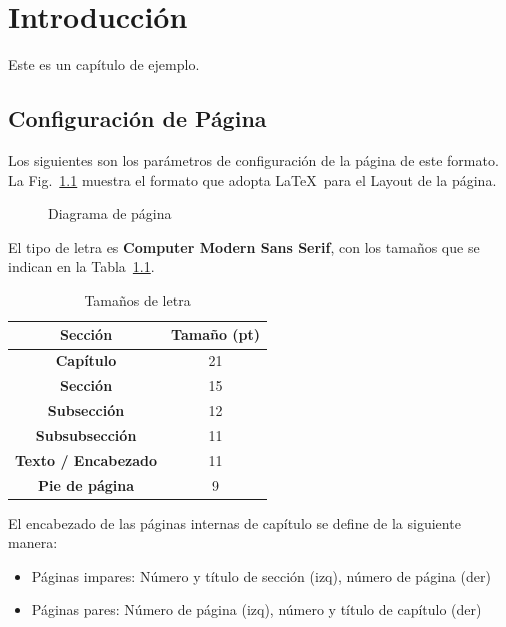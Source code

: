 \chapter{Introducción} \label{intro}
Este es un capítulo de ejemplo.

\section{Configuración de Página}

Los siguientes son los parámetros de configuración de la página de este formato. La Fig.~\ref{fig1_intro} muestra el formato que adopta \LaTeX\ para el Layout de la página. 

\pagevalues

\begin{figure}[ht]
	\pagediagram
	\caption{Diagrama de página}
	\label{fig1_intro}
\end{figure}

El tipo de letra es \textbf{Computer Modern Sans Serif}, con los tamaños que se indican en la Tabla~\ref{table2_intro}.

\begin{table}[htb]
\renewcommand{\arraystretch}{1.3}
	\caption{Tamaños de letra} 
	\label{table2_intro}
	\centering
	\setlength\tabcolsep{2pt}
	\begin{tabular}{c c}
		\hline
		\bfseries Sección & \bfseries Tamaño (pt)\\
		\hline
		 \bfseries Capítulo & 21  \\
		 \bfseries Sección & 15  \\
		 \bfseries Subsección & 12  \\
		 \bfseries Subsubsección & 11  \\
        \bfseries Texto / Encabezado& 11  \\
		\bfseries Pie de página & 9  \\
		\hline
	\end{tabular}
\end{table}

El encabezado de las páginas internas de capítulo se define de la siguiente manera: 
\begin{itemize}
    \item Páginas impares: Número y título de sección (izq), número de página (der)
    \item Páginas pares: Número de página (izq), número y título de capítulo (der)
\end{itemize}

